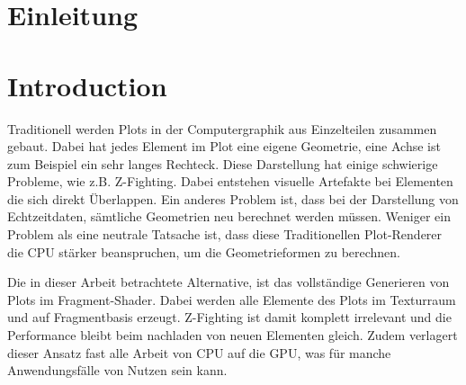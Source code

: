 {\chapter{Einleitung}}
{\chapter{Introduction}}

\label{sec:introduction}

Traditionell werden Plots in der Computergraphik aus Einzelteilen zusammen gebaut.
Dabei hat jedes Element im Plot eine eigene Geometrie, eine Achse ist zum Beispiel ein sehr langes Rechteck.
Diese Darstellung hat einige schwierige Probleme, wie z.B. Z-Fighting.
Dabei entstehen visuelle Artefakte bei Elementen die sich direkt Überlappen.
Ein anderes Problem ist, dass bei der Darstellung von Echtzeitdaten, sämtliche Geometrien neu berechnet werden müssen.
Weniger ein Problem als eine neutrale Tatsache ist, dass diese Traditionellen Plot-Renderer die CPU stärker beanspruchen, um die Geometrieformen zu berechnen.
\par
Die in dieser Arbeit betrachtete Alternative, ist das vollständige Generieren von Plots im Fragment-Shader.
Dabei werden alle Elemente des Plots im Texturraum und auf Fragmentbasis erzeugt.
Z-Fighting ist damit komplett irrelevant und die Performance bleibt beim nachladen von neuen Elementen gleich.
Zudem verlagert dieser Ansatz fast alle Arbeit von CPU auf die GPU, was für manche Anwendungsfälle von Nutzen sein kann.


